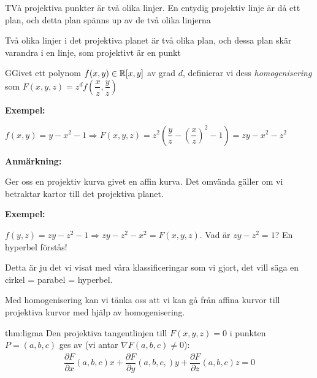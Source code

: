 \par\bigskip
\begin{prf}
  TVå projektiva punkter är två olika linjer. En entydig projektiv linje är då ett plan, och detta plan spänns up av de två olika linjerna
  \par\bigskip
  \noindent Två olika linjer i det projektiva planet är två olika plan, och dessa plan skär varandra i en linje, som projektivt är en punkt
\end{prf}
\par\bigskip
\begin{theo}
  GGivet ett polynom $f(x,y)\in\mathbb{R}[x,y]$ av grad $d$, definierar vi dess \textit{homogenisering} som $F(x,y,z) = z^df\left(\dfrac{x}{z},\dfrac{y}{z}\right)$ 
\end{theo}
\par\bigskip
\noindent\textbf{Exempel:}\par
\noindent $f(x,y) = y-x^2-1\Rightarrow F(x,y,z) = z^2\left(\dfrac{y}{z}-\left(\dfrac{x}{z}\right)^2-1\right) = zy-x^2-z^2$
\par\bigskip
\noindent\textbf{Anmärkning:}\par
\noindent Ger oss en projektiv kurva givet en affin kurva. Det omvända gäller om vi betraktar kartor till det projektiva planet.
\par\bigskip
\noindent\textbf{Exempel:}\par
\noindent $f(y,z)=zy-z^2-1\Rightarrow zy-z^2-x^2=F(x,y,z)$. Vad är $zy-z^2=1$? En hyperbel förstås!\par
\noindent Detta är ju det vi visat med våra klassificeringar som vi gjort, det vill säga en cirkel = parabel = hyperbel.
\par\bigskip
\noindent Med homogenisering kan vi tänka oss att vi kan gå från affina kurvor till projektiva kurvor med hjälp av homogenisering.
\par\bigskip
\begin{theo}{thm:ligma}
  Den projektiva tangentlinjen till $F(x,y,z) = 0$ i punkten $P=(a,b,c)$ ges av (vi antar $\nabla F(a,b,c)\neq0$):
  \begin{equation*}
    \begin{gathered}
      \dfrac{\partial F}{\partial x} (a,b,c)x+\dfrac{\partial F}{\partial y}(a,b,c,)y+ \dfrac{\partial F}{\partial z}(a,b,c)z =0
    \end{gathered}
  \end{equation*}
\end{theo}
\par\bigskip
